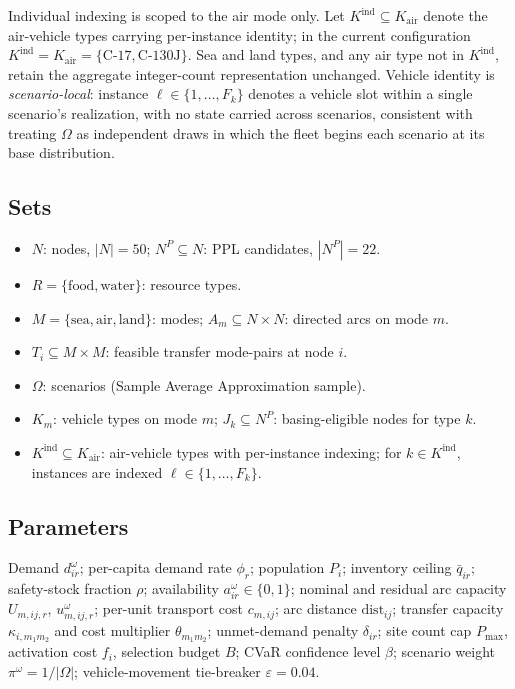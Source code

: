 Individual indexing is scoped to the air mode only. Let
$K^{\mathrm{ind}} \subseteq K_{\mathrm{air}}$ denote the air-vehicle types
carrying per-instance identity; in the current configuration
$K^{\mathrm{ind}} = K_{\mathrm{air}} = \{\text{C-17}, \text{C-130J}\}$. Sea and
land types, and any air type not in $K^{\mathrm{ind}}$, retain the aggregate
integer-count representation unchanged. Vehicle identity is
\emph{scenario-local}: instance $\ell \in \{1,\dots,F_k\}$ denotes a vehicle
slot within a single scenario's realization, with no state carried across
scenarios, consistent with treating $\Omega$ as independent draws in which the
fleet begins each scenario at its base distribution.

\subsection{Sets}
\label{sec:vif:sets}

\begin{itemize}
  \item $N$: nodes, $|N| = 50$; $N^P \subseteq N$: PPL candidates, $|N^P| = 22$.
  \item $R = \{\text{food}, \text{water}\}$: resource types.
  \item $M = \{\text{sea}, \text{air}, \text{land}\}$: modes;
        $A_m \subseteq N \times N$: directed arcs on mode $m$.
  \item $T_i \subseteq M \times M$: feasible transfer mode-pairs at node $i$.
  \item $\Omega$: scenarios (Sample Average Approximation sample).
  \item $K_m$: vehicle types on mode $m$; $J_k \subseteq N^P$: basing-eligible
        nodes for type $k$.
  \item $K^{\mathrm{ind}} \subseteq K_{\mathrm{air}}$: air-vehicle types with
        per-instance indexing; for $k \in K^{\mathrm{ind}}$, instances are
        indexed $\ell \in \{1,\dots,F_k\}$.
\end{itemize}

\subsection{Parameters}
\label{sec:vif:params}

Demand $d^\omega_{ir}$; per-capita demand rate $\phi_r$; population $P_i$;
inventory ceiling $\bar{q}_{ir}$; safety-stock fraction $\rho$; availability
$a^\omega_{ir}\in\{0,1\}$; nominal and residual arc capacity $U_{m,ij,r}$,
$u^\omega_{m,ij,r}$; per-unit transport cost $c_{m,ij}$; arc distance
$\text{dist}_{ij}$; transfer capacity $\kappa_{i,m_1m_2}$ and cost multiplier
$\theta_{m_1m_2}$; unmet-demand penalty $\delta_{ir}$; site count cap
$P_{\max}$, activation cost $f_i$, selection budget $B$; CVaR confidence level
$\beta$; scenario weight $\pi^\omega = 1/|\Omega|$; vehicle-movement
tie-breaker $\varepsilon = 0.04$.

